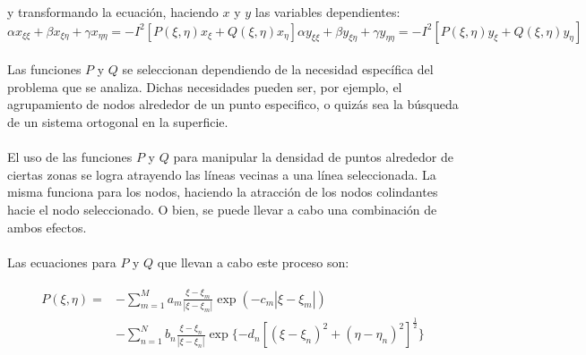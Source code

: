 \documentclass[letterpaper, openright, 12pt]{book}
\begin{document}
				y transformando la ecuación, haciendo $x$ y $y$  las variables dependientes:
				\begin{subequations}
					\begin{equation}
						\alpha x_{\xi \xi} + \beta x_{\xi \eta} + \gamma x_{\eta \eta} = -I^2 [P(\xi, \eta) x_{\xi} + Q(\xi, \eta) x_{\eta}]
					\end{equation}
					\begin{equation}
					\alpha y_{\xi \xi} + \beta y_{\xi \eta} + \gamma y_{\eta \eta} = -I^2 [P(\xi, \eta) y_{\xi} + Q(\xi, \eta) y_{\eta}]
					\end{equation}
					\label{ec-poisson-invertida}
				\end{subequations}
			
		\paragraph*{}
			Las funciones $P$ y $Q$ se seleccionan dependiendo de la necesidad específica del problema que se analiza. Dichas necesidades pueden ser, por ejemplo, el agrupamiento de nodos alrededor de un punto especifico, o quizás sea la búsqueda de un sistema ortogonal en la superficie.
		
		\paragraph*{}
			El uso de las funciones $P$ y $Q$ para manipular la densidad de puntos alrededor de ciertas zonas se logra atrayendo las líneas vecinas a una línea seleccionada. La misma funciona para los nodos, haciendo la atracción de los nodos colindantes hacie el nodo seleccionado. O bien, se puede llevar a cabo una combinación de ambos efectos.
		
		\paragraph*{}
			Las ecuaciones para $P$ y $Q$ que llevan a cabo este proceso son:
			
			\begin{align}
				\begin{aligned}
					P(\xi, \eta) =& - \sum_{m = 1}^{M} a_{m} \frac{\xi - \xi_{m}}{|\xi - \xi_{m}|} \exp(-c_{m}|\xi - \xi_{m}|) \\&
					- \sum_{n=1}^{N} b_{n} \frac{\xi - \xi_{n}}{| \xi - \xi_{n} |} \exp\lbrace -d_{n} \left[ \left( \xi - \xi_{n} \right)^2 + \left( \eta - \eta_{n} \right)^2 \right]^\frac{1}{2} \rbrace
				\end{aligned}
				\label{ec-P}
			\end{align}
				
\end{document}
